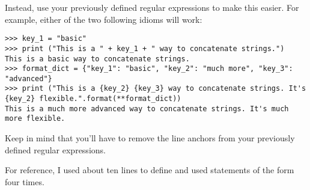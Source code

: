 \begin{problem}
\begin{warn}
Instead, use your previously defined regular expressions to make this easier. For example, either of the two following idioms will work:
\begin{lstlisting}
>>> key_1 = "basic"
>>> print ("This is a " + key_1 + " way to concatenate strings.")
This is a basic way to concatenate strings.
>>> format_dict = {"key_1": "basic", "key_2": "much more", "key_3": "advanced"}
>>> print ("This is a {key_2} {key_3} way to concatenate strings. It's {key_2} flexible.".format(**format_dict))
This is a much more advanced way to concatenate strings. It's much more flexible.
\end{lstlisting}
Keep in mind that you'll have to remove the line anchors from your previously defined regular expressions.

For reference, I used about ten lines to define  and used statements of the form  four times.
\end{warn}

\label{prob:match_function_definition}
\end{problem}
